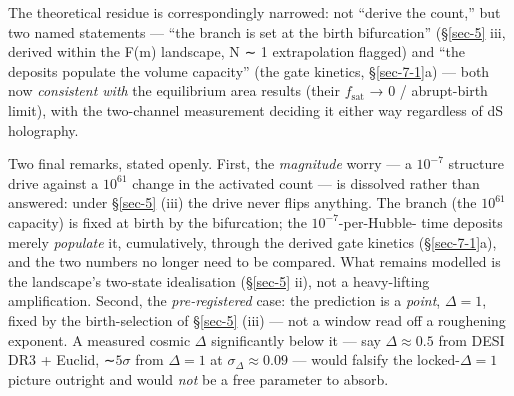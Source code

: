 \documentclass[aps,prd,preprint,nofootinbib,superscriptaddress]{revtex4-2}
\begin{document}
The theoretical residue is correspondingly narrowed: not ``derive the
count,'' but two named statements --- ``the branch is set at the birth
bifurcation'' (§\ref{sec-5} iii, derived within the F(m) landscape, N ∼
1 extrapolation flagged) and ``the deposits populate the volume
capacity'' (the gate kinetics, §\ref{sec-7-1}a) --- both now
\emph{consistent with} the equilibrium area results (their
\(f_{\mathrm{sat}}\) → 0 / abrupt-birth limit), with the two-channel
measurement deciding it either way regardless of dS holography.

Two final remarks, stated openly. First, the \emph{magnitude} worry ---
a \(10^{-7}\) structure drive against a \(10^{61}\) change in the
activated count --- is dissolved rather than answered: under
§\ref{sec-5} (iii) the drive never flips anything. The branch (the
\(10^{61}\) capacity) is fixed at birth by the bifurcation; the
\(10^{-7}\)-per-Hubble- time deposits merely \emph{populate} it,
cumulatively, through the derived gate kinetics (§\ref{sec-7-1}a), and
the two numbers no longer need to be compared. What remains modelled is
the landscape's two-state idealisation (§\ref{sec-5} ii), not a
heavy-lifting amplification. Second, the \emph{pre-registered} case: the
prediction is a \emph{point}, \(\Delta  = 1\), fixed by the
birth-selection of §\ref{sec-5} (iii) --- not a window read off a
roughening exponent. A measured cosmic \(\Delta\) significantly below it
--- say \(\Delta  \approx  0.5\) from DESI DR3 + Euclid, ∼\(5\sigma\)
from \(\Delta  = 1\) at \(\sigma _\Delta  \approx  0.09\) --- would
falsify the locked-\(\Delta  = 1\) picture outright and would \emph{not}
be a free parameter to absorb.
\end{document}
